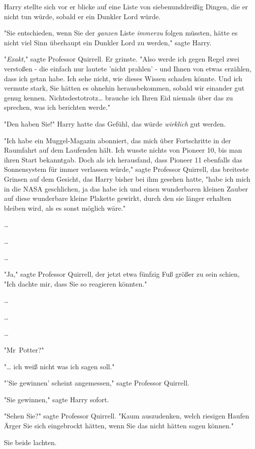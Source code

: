 {Harry stellte sich vor er blicke auf eine Liste von siebenunddreißig Dingen, die er nicht tun würde, sobald er ein Dunkler Lord würde.

"Sie entschieden, wenn Sie der \emph{ganzen} Liste \emph{immerzu} folgen müssten, hätte es nicht viel Sinn überhaupt ein Dunkler Lord zu werden," sagte Harry.

"\emph{Exakt,}" sagte Professor Quirrell. Er grinste. "Also werde ich gegen Regel zwei verstoßen - die einfach nur lautete 'nicht prahlen' - und Ihnen von etwas erzählen, dass ich getan habe. Ich sehe nicht, wie dieses Wissen schaden könnte. Und ich vermute stark, Sie hätten es ohnehin herausbekommen, sobald wir einander gut genug kennen. Nichtsdestotrotz… brauche ich Ihren Eid niemals über das zu sprechen, was ich berichten werde."

"Den haben Sie!" Harry hatte das Gefühl, das würde \emph{wirklich} gut werden.

"Ich habe ein Muggel-Magazin abonniert, das mich über Fortschritte in der Raumfahrt auf dem Laufenden hält. Ich wusste nichts von Pioneer 10, bis man ihren Start bekanntgab. Doch als ich herausfand, dass Pioneer 11 ebenfalls das Sonnensystem für immer verlassen würde," sagte Professor Quirrell, das breiteste Grinsen auf dem Gesicht, das Harry bisher bei ihm gesehen hatte, "habe ich mich in die NASA geschlichen, ja das habe ich und einen wunderbaren kleinen Zauber auf diese wunderbare kleine Plakette gewirkt, durch den sie länger erhalten bleiben wird, als es sonst möglich wäre."

…

…

…

"Ja," sagte Professor Quirrell, der jetzt etwa fünfzig Fuß größer zu sein schien, "Ich dachte mir, dass Sie so reagieren könnten."

…

…

…

"Mr~Potter?"

"… ich weiß nicht was ich sagen soll."

"'Sie gewinnen' scheint angemessen," sagte Professor Quirrell.

"Sie gewinnen," sagte Harry sofort.

"Sehen Sie?" sagte Professor Quirrell. "Kaum auszudenken, welch riesigen Haufen Ärger Sie sich eingebrockt hätten, wenn Sie das nicht hätten sagen können."

Sie beide lachten.

}
